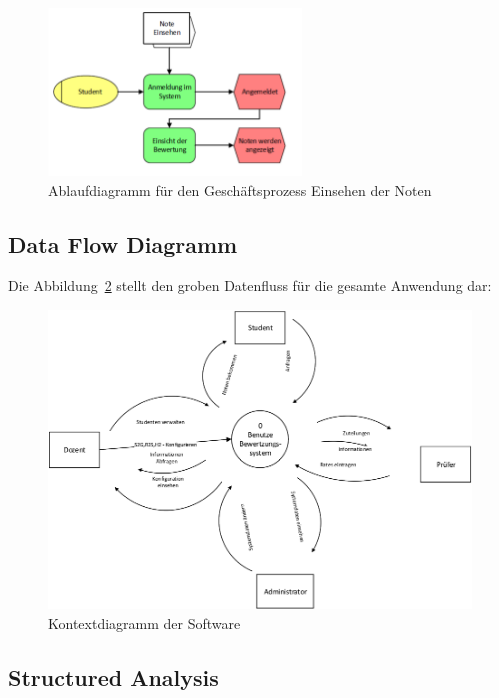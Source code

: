 \begin{appendix}
  	\begin{figure}[th!]
  	\centering
  	\includegraphics[width=0.6\textwidth]{./img/EPK_Einsehen}
  	\caption{Ablaufdiagramm für den Geschäftsprozess Einsehen der Noten}
  	\label{fig:process3}
  	\end{figure}
  
\clearpage
\subsection{Data Flow Diagramm}
  Die Abbildung~\ref{fig:kontextdiagramm} stellt den groben Datenfluss für die gesamte Anwendung dar:
 
   \begin{figure}[ht]
 \centering
 \includegraphics[width=\textwidth]{./img/dfd_context}
 \caption{Kontextdiagramm der Software}
 \label{fig:kontextdiagramm}
 \end{figure}
 

  \clearpage
 \subsection{Structured Analysis} 
 

\end{appendix}

